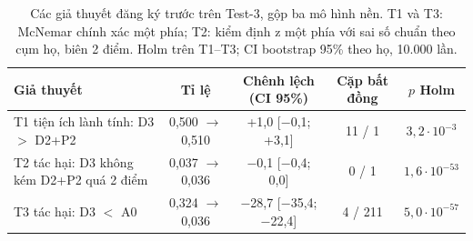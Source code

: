 \begin{table}[t]
\centering
\caption{Các giả thuyết đăng ký trước trên Test-3, gộp ba mô hình nền. T1 và T3: McNemar chính xác một phía; T2:
kiểm định z một phía với sai số chuẩn theo cụm họ, biên 2 điểm. Holm trên T1--T3; CI bootstrap 95\% theo họ, 10.000
lần.}\label{tab:hyp}
\small
\begin{tabular}{@{}p{}cccc@{}}
\toprule
Giả thuyết & Tỉ lệ & Chênh lệch (CI 95\%) & Cặp bất đồng & $p$ Holm \\
\midrule
T1 tiện ích lành tính: D3 $>$ D2+P2 & 0,500 $\to$ 0,510 & +1,0 [$-$0,1; +3,1] & 11 / 1 & $3{,}2\cdot10^{-3}$ \\
T2 tác hại: D3 không kém D2+P2 quá 2 điểm & 0,037 $\to$ 0,036 & $-$0,1 [$-$0,4; 0,0] & 0 / 1 & $1{,}6\cdot10^{-53}$ \\
T3 tác hại: D3 $<$ A0 & 0,324 $\to$ 0,036 & $-$28,7 [$-$35,4; $-$22,4] & 4 / 211 & $5{,}0\cdot10^{-57}$ \\
\bottomrule
\end{tabular}
\end{table}
